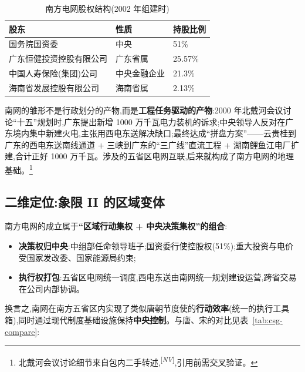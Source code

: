 \documentclass[UTF8,12pt,a4paper]{ctexrep}
\newcommand{\src}[1]{\textsuperscript{[\emph{#1}]}}
\begin{document}
\begin{table}[htbp]
  \centering
  \small
  \caption{南方电网股权结构(2002 年组建时)}
  \label{tab:csg-equity}
  \begin{tabularx}{\linewidth}{@{}lXl@{}}
    \toprule
    \textbf{股东} & \textbf{性质} & \textbf{持股比例} \\
    \midrule
    国务院国资委 & 中央 & 51\% \\
    广东恒健投资控股有限公司 & 广东省属 & 25.57\% \\
    中国人寿保险(集团)公司 & 中央金融企业 & 21.3\% \\
    海南省发展控股有限公司 & 海南省属 & 2.13\% \\
    \bottomrule
  \end{tabularx}
\end{table}

南网的雏形不是行政划分的产物,而是\textbf{工程任务驱动的产物}:2000 年北戴河会议讨论``十五''规划时,广东提出新增 1000 万千瓦电力装机的诉求;中央领导人反对在广东境内集中新建火电,主张用西电东送解决缺口;最终达成``拼盘方案''——云贵桂到广东的西电东送南线通道 + 三峡到广东的``三广线''直流工程 + 湖南鲤鱼江电厂扩建,合计正好 1000 万千瓦。涉及的五省区电网互联,后来就构成了南方电网的地理基础。\footnote{北戴河会议讨论细节来自包内二手转述,\src{NV},引用前需交叉验证。}

\subsection{二维定位:象限 II 的区域变体}

南方电网的成立属于\textbf{``区域行动集权 + 中央决策集权''的组合}:

\begin{itemize}
  \item \textbf{决策权归中央}:中组部任命领导班子;国资委行使控股权(51\%);重大投资与电价受国家发改委、国家能源局约束;
  \item \textbf{执行权打包}:五省区电网统一调度,西电东送由南网统一规划建设运营,跨省交易在公司内部协调。
\end{itemize}

换言之,南网在南方五省区内实现了类似唐朝节度使的\textbf{行动效率}(统一的执行工具箱),同时通过现代制度基础设施保持\textbf{中央控制}。与唐、宋的对比见表~\ref{tab:csg-compare}:
\end{document}
